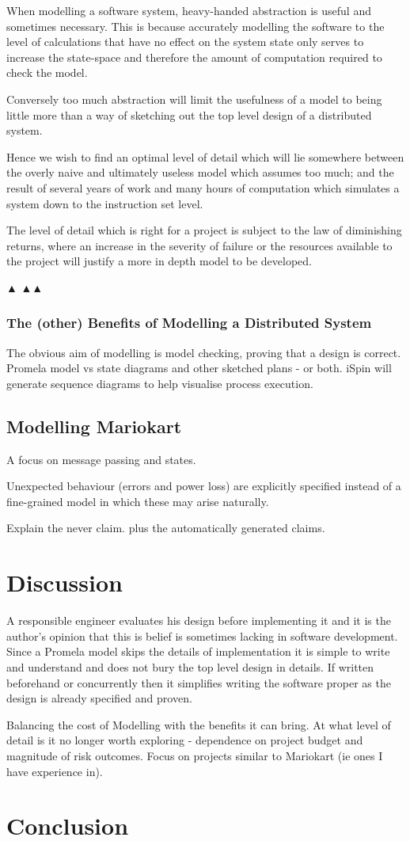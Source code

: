 When modelling a software system, heavy-handed abstraction is useful
and sometimes necessary. This is because accurately modelling the software
to the level of calculations that have no effect on the system state only 
serves to increase the state-space and therefore the amount of computation
required to check the model. 

Conversely too much abstraction will limit the usefulness of a model to 
being little more than a way of sketching out the top level design of a 
distributed system.

Hence we wish to find an optimal level of detail  which will lie somewhere between the overly 
naive and ultimately useless model which assumes too much; and the result
of several years of work and many hours of computation which simulates
a system down to the instruction set level. 

The level of detail which is right for a project is subject to the law of diminishing
returns, where an increase in the severity of failure or the resources available to
the project will justify a more in depth model to be developed.

  ▲
▲▲
\subsubsection{The (other) Benefits of Modelling a Distributed System}
The obvious aim of modelling is model checking, proving that a design is
correct. 
Promela model vs state diagrams and other sketched plans - or both. iSpin will
 generate sequence diagrams to help visualise process execution.

\subsection{Modelling Mariokart}
A focus on message passing and states.

Unexpected behaviour (errors and power loss) are explicitly specified instead of 
a fine-grained model in which these may arise naturally.

Explain the never claim. plus the automatically generated claims.


\section{Discussion}
A responsible engineer evaluates his design before implementing it and it is the author's opinion 
that this is belief is sometimes lacking in software development. Since a Promela model skips
the details of implementation it is simple to write and understand and does not bury the top level design 
in details. If written beforehand or concurrently then it simplifies writing the software proper
as the design is already specified and proven.

Balancing the cost of Modelling with the benefits it can bring. At what level of detail is it no longer worth 
exploring - dependence on project budget and magnitude of risk outcomes. Focus on projects similar to
Mariokart (ie ones I have experience in).

\section{Conclusion}

